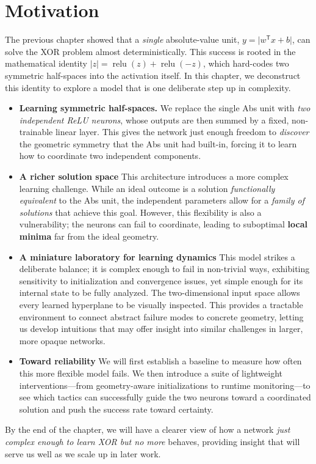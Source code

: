\section{Motivation}
\label{sec:relu1-motivation}

The previous chapter showed that a \emph{single} absolute-value unit, \(y=\lvert w^{\mathsf T} x + b\rvert\), can solve the XOR problem almost deterministically. This success is rooted in the mathematical identity \(\lvert z\rvert=\operatorname{relu}(z)+\operatorname{relu}(-z)\), which hard-codes two symmetric half-spaces into the activation itself. In this chapter, we deconstruct this identity to explore a model that is one deliberate step up in complexity.

\begin{itemize}
    \item \textbf{Learning symmetric half-spaces.}
        We replace the single Abs unit with \emph{two independent ReLU neurons}, whose outputs are then summed by a fixed, non-trainable linear layer. This gives the network just enough freedom to \emph{discover} the geometric symmetry that the Abs unit had built-in, forcing it to learn how to coordinate two independent components.

    \item \textbf{A richer solution space}
        This architecture introduces a more complex learning challenge. While an ideal outcome is a solution \emph{functionally equivalent} to the Abs unit, the independent parameters allow for a \emph{family of solutions} that achieve this goal. However, this flexibility is also a vulnerability; the neurons can fail to coordinate, leading to suboptimal \textbf{local minima} far from the ideal geometry.

    \item \textbf{A miniature laboratory for learning dynamics}
        This model strikes a deliberate balance; it is complex enough to fail in non-trivial ways, exhibiting sensitivity to initialization and convergence issues, yet simple enough for its internal state to be fully analyzed. The two-dimensional input space allows every learned hyperplane to be visually inspected. This provides a tractable environment to connect abstract failure modes to concrete geometry, letting us develop intuitions that may offer insight into similar challenges in larger, more opaque networks.
    \item \textbf{Toward reliability}
        We will first establish a baseline to measure how often this more flexible model fails. We then introduce a suite of lightweight interventions—from geometry-aware initializations to runtime monitoring—to see which tactics can successfully guide the two neurons toward a coordinated solution and push the success rate toward certainty.
\end{itemize}

By the end of the chapter, we will have a clearer view of how a network \emph{just complex enough to learn XOR but no more} behaves, providing insight that will serve us well as we scale up in later work.